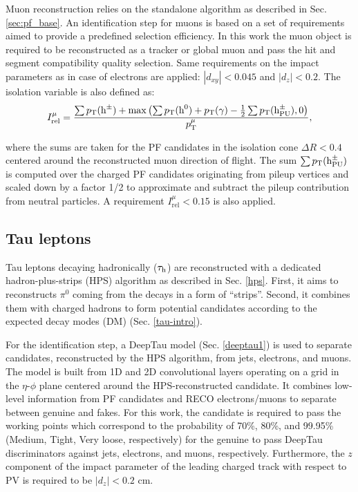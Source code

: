 Muon reconstruction relies on the standalone algorithm as described in Sec. \ref{sec:pf_base}. An identification step for muons is based on a set of requirements aimed to provide a predefined selection efficiency. In this work the muon object is required to be reconstructed as a tracker or global muon and pass the hit and segment compatibility quality selection. Same requirements on the impact parameters as in case of electrons are applied: $|d_{xy}| < 0.045$ and $|d_z| < 0.2$. The isolation variable is also defined as:
\begin{equation}\label{eq:iso_mu}
    I^\mu_{\text{rel}} = \dfrac{\sum p_{\text{T}}(\text{h}^\pm) + \max\left(\sum p_{\text{T}}(\text{h}^0) + p_{\text{T}}(\gamma) - \frac{1}{2}\sum p_{\text{T}}(\text{h}^\pm_{\text{PU}}), 0\right)}{p_{\text{T}}^\mu},
\end{equation}

where the sums are taken for the PF candidates in the isolation cone $\Delta R < 0.4$ centered around the reconstructed muon direction of flight. The sum $\sum p_{\text{T}}(\text{h}^\pm_{\text{PU}})$ is computed over the charged PF candidates originating from pileup vertices and scaled down by a factor 1/2 to approximate and subtract the pileup contribution from neutral particles. A requirement $I^\mu_{\text{rel}} < 0.15$ is also applied.  

\subsection{Tau leptons}\label{sec:reco_tau}
Tau leptons decaying hadronically ($\tau_\mathrm{h}$) are reconstructed with a dedicated hadron-plus-strips (HPS) algorithm as described in Sec. \ref{hps}. First, it aims to reconstructs $\pi^0$ coming from the \tauh decays in a form of \enquote{strips}. Second, it combines them with charged hadrons to form potential \tauh candidates according to the expected decay modes (DM) (Sec. \ref{tau-intro}).

For the identification step, a DeepTau model (Sec. \ref{deeptau1}) is used to separate \tauh candidates, reconstructed by the HPS algorithm, from jets, electrons, and muons. The model is built from 1D and 2D convolutional layers operating on a grid in the $\eta$-$\phi$ plane centered around the HPS-reconstructed \tauh candidate. It combines low-level information from PF candidates and RECO electrons/muons to  separate between genuine \tauh and fakes. For this work, the \tauh candidate is required to pass the working points which correspond to the probability of 70\%, 80\%, and 99.95\% (Medium, Tight, Very loose, respectively) for the genuine \tauh to pass DeepTau discriminators against jets, electrons, and muons, respectively. Furthermore, the $z$ component of the impact parameter of the leading charged track with respect to PV is required to be $|d_z| < 0.2$ cm.

